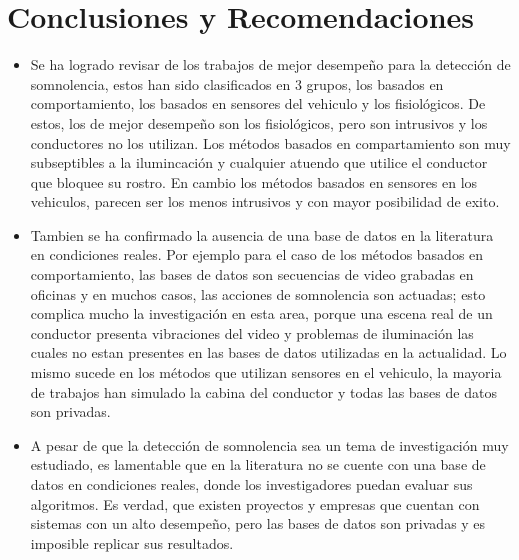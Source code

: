 \documentclass{article}
\begin{document}
	
	\section{Conclusiones y Recomendaciones}
	\begin{itemize}
		\item Se ha logrado revisar de los trabajos de mejor desempeño para la detección de somnolencia, estos han sido clasificados en 3 grupos, los basados en comportamiento, los basados en sensores del vehiculo y los fisiológicos. De estos, los de mejor desempeño son los fisiológicos, pero son intrusivos y los conductores no los utilizan. Los métodos basados en compartamiento son muy subseptibles a la ilumincación y cualquier atuendo que utilice el conductor que bloquee su rostro. En cambio los métodos basados en sensores en los vehiculos, parecen ser los menos intrusivos y con mayor posibilidad de exito.
		\item Tambien se ha confirmado la ausencia de una base de datos en la literatura en condiciones reales. Por ejemplo para el caso de los métodos basados en comportamiento, las bases de datos son secuencias de video grabadas en oficinas y en muchos casos, las acciones de somnolencia son actuadas; esto complica mucho la investigación en esta area, porque una escena real de un conductor presenta vibraciones del video y problemas de iluminación las cuales no estan presentes en las bases de datos utilizadas en la actualidad. Lo mismo sucede en los métodos que utilizan sensores en el vehiculo, la mayoria de trabajos han simulado la cabina del conductor y todas las  bases de datos son privadas.
		\item A pesar de que la detección de somnolencia sea un tema de investigación muy estudiado, es lamentable que en la literatura no se cuente con una base de datos en condiciones reales, donde los investigadores puedan evaluar sus algoritmos. Es verdad, que existen proyectos y empresas que cuentan con sistemas con un alto desempeño, pero las bases de datos son privadas y es imposible replicar sus resultados.		
	\end{itemize}



	
\end{document}
